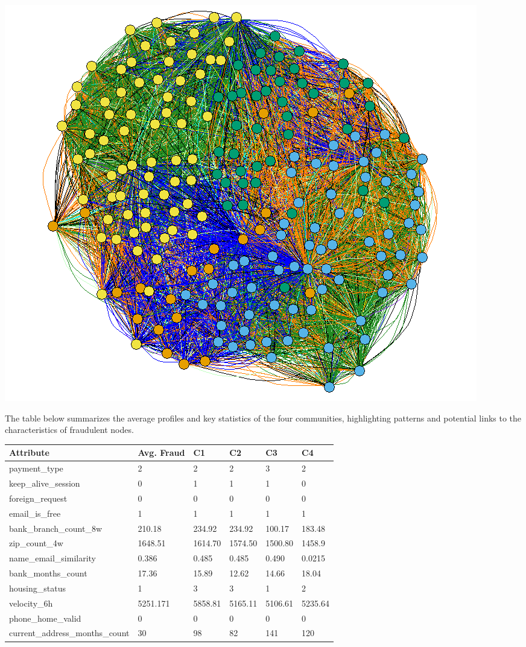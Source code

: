 \documentclass{styles/svproc}
\begin{document}
\bigskip
\includegraphics[scale=0.65]{q2comm}  

\bigskip
{}

\bigskip
\noindent The table below summarizes the average profiles and key statistics of the four communities, highlighting patterns and potential links to the characteristics of fraudulent nodes.

\bigskip
\noindent
\begin{tabular}{ | m{4.7cm} | m{1.8cm}| m{1.25cm}| m{1.25cm}| m{1.25cm}| m{1.25cm}|} 
  \hline
  \textbf{Attribute} & \textbf{Avg. Fraud} & \textbf{C1} & \textbf{C2} & \textbf{C3} & \textbf{C4}\\ 
  \hline
  payment\_type & 2 & 2 & 2 & 3 & 2 \\ 
  \hline
  keep\_alive\_session & 0 & 1 & 1 & 1 & 0 \\ 
  \hline
  foreign\_request & 0 & 0 & 0 & 0 & 0 \\
  \hline
  email\_is\_free & 1 & 1 & 1 & 1 & 1 \\
  \hline
  bank\_branch\_count\_8w & 210.18 & 234.92 & 234.92 & 100.17 & 183.48 \\
  \hline
  zip\_count\_4w & 1648.51 & 1614.70 & 1574.50 & 1500.80 & 1458.9 \\
  \hline
  name\_email\_similarity & 0.386 & 0.485 & 0.485 & 0.490 & 0.0215 \\
  \hline
  bank\_months\_count & 17.36 & 15.89 & 12.62 & 14.66 & 18.04 \\
  \hline
  housing\_status & 1 & 3 & 3 & 1 & 2 \\
  \hline
  velocity\_6h & 5251.171 & 5858.81 & 5165.11 & 5106.61 & 5235.64 \\
  \hline
  phone\_home\_valid & 0 & 0 & 0 & 0 & 0 \\
  \hline
  current\_address\_months\_count & 30 & 98 & 82 & 141 & 120 \\
  \hline
\end{tabular}
\end{document}
